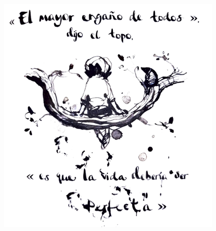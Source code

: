 \documentclass[spanish]{textolivre}
\begin{document}
\begin{figure}[htbp]
\begin{minipage}[t]{0.32\textwidth}
\includegraphics[width=\linewidth]{Fig1.png}
\label{fig1}
\end{minipage}
\hfill
\begin{minipage}[t]{0.32\textwidth}

\end{minipage}
\end{figure}
\end{document}
